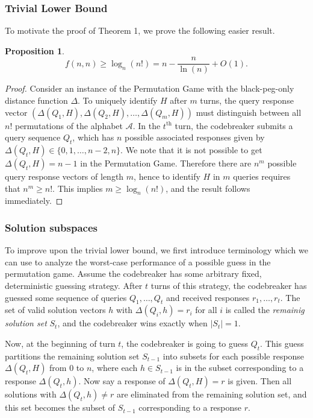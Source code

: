 \documentclass[12pt, a4paper]{article}
\newcommand{\nth}{^{\text{th}}}       %
\newtheorem{proposition}{Proposition}
\begin{document}
	\subsubsection{Trivial Lower Bound}
	To motivate the proof of Theorem 1, we prove the following easier result.
	\begin{proposition}
		\begin{equation*}
			f(n, n)\ge \log_{n}(n!) = n-\frac{n}{\ln(n)}+O(1).		
		\end{equation*}
	\end{proposition}
	\begin{proof}
		Consider an instance of the Permutation Game with the black-peg-only distance function $\Delta$. To uniquely identify $H$ after $m$ turns, the query response vector $(\Delta(Q_1, H), \Delta(Q_2, H), \ldots, \Delta(Q_m, H))$ must distinguish between all $n!$ permutations of the alphabet $\mathcal{A}$. In the $t\nth$ turn, the codebreaker submits a query sequence $Q_t$, which has $n$ possible associated responses given by $\Delta(Q_t, H)\in\{0, 1, \ldots, n-2, n\}$. We note that it is not possible to get $\Delta(Q_t, H)=n-1$ in the Permutation Game. Therefore there are $n^m$ possible query response vectors of length $m$, hence to identify $H$ in $m$ queries requires that $n^m\ge n!$. This implies $m\ge\log_n(n!)$, and the result follows immediately.
	\end{proof}

	\subsubsection{Solution subspaces}
	To improve upon the trivial lower bound, we first introduce terminology which we can use to analyze the worst-case performance of a possible guess in the permutation game. Assume the codebreaker has some arbitrary fixed, deterministic guessing strategy. After $t$ turns of this strategy, the codebreaker has guessed some sequence of queries $Q_1, \dots, Q_t$ and received responses $r_1,\dots,r_t$. The set of valid solution vectors $h$ with $\Delta(Q_i,h) = r_i$ for all $i$ is called the \textit{remainig solution set} $S_t$, and the codebreaker wins exactly when $|S_t| = 1$.
	
	Now, at the beginning of turn $t$, the codebreaker is going to guess $Q_t$. This guess partitions the remaining solution set $S_{t-1}$ into subsets for each possible response $\Delta(Q_t,H)$ from 0 to $n$, where each $h \in S_{t-1}$ is in the subset corresponding to a response $\Delta(Q_t,h)$. Now say a response of $\Delta(Q_t,H) = r$ is given. Then all solutions with $\Delta(Q_t,h) \neq r$ are eliminated from the remaining solution set, and this set becomes the subset of $S_{t-1}$ corresponding to a response $r$.
	
\end{document}
